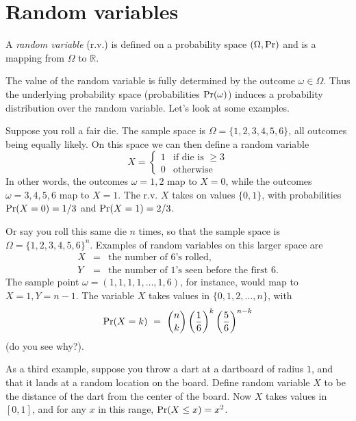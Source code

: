 \documentclass{report}
\theoremstyle{plain}
\theoremstyle{definition}
\newcommand{\R}{\mathbb{R}}
\newcommand{\pr}{\mbox{\rm Pr}}
\begin{document}
\scribe{}

\maketitle

\section{Random variables}

A {\it random variable} (r.v.) is defined on a probability space $(\Omega, \pr)$ and 
is a mapping from $\Omega$ to $\R$. 

The value of the random variable is fully determined by the outcome $\omega \in \Omega$.
Thus the underlying probability space (probabilities $\pr(\omega)$) induces a probability
distribution over the random variable. Let's look at some examples.

Suppose you roll a fair die. The sample space is $\Omega = \{1,2,3,4,5,6\}$, all outcomes 
being equally likely. On this space we can then define a random variable
$$ X = \left\{ \begin{array}{ll}
               1 & \mbox{if die is $\geq 3$} \\
               0 & \mbox{otherwise}
               \end{array} \right.$$
In other words, the outcomes $\omega = 1,2$ map to $X = 0$, while the outcomes 
$\omega = 3,4,5,6$ map to $X = 1$. The r.v. $X$ takes on values $\{0,1\}$, with 
probabilities $\pr(X = 0) = 1/3$ and $\pr(X=1) = 2/3$.

Or say you roll this same die $n$ times, so that the sample space is 
$\Omega = \{1,2,3,4,5,6\}^n$. Examples of random variables on this larger space are
\begin{eqnarray*}
X & = & \mbox{the number of 6's rolled,} \\
Y & = & \mbox{the number of 1's seen before the first 6.}
\end{eqnarray*}
The sample point $\omega = (1,1,1,1,\ldots,1,6)$, for instance, would map to 
$X = 1, Y = n-1$. The variable $X$ takes values in $\{0,1,2,\ldots,n\}$,
with
$$ \pr(X = k) 
\ = \ 
{n \choose k} \left(\frac{1}{6} \right)^k \left( \frac{5}{6} \right)^{n-k} $$
(do you see why?).

As a third example, suppose you throw a dart at a dartboard of radius $1$, and that it
lands at a random location on the board. Define random variable $X$ to be the distance
of the dart from the center of the board. Now $X$ takes values in $[0,1]$, and for 
any $x$ in this range, $\pr(X \leq x) = x^2$.
\end{document}
